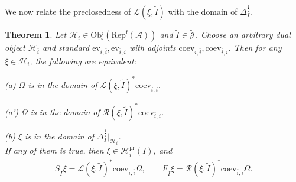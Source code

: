 \documentclass[12pt,a4paper]{article}
\theoremstyle{definition}
\theoremstyle{plain}
\newtheorem{thm}[df]{Theorem}
\newcommand{\mc}{\mathcal}
\newcommand{\wtd}{\widetilde}
\newcommand{\ovl}{\overline}
\newcommand{\ev}{\mathrm{ev}}
\newcommand{\coev}{\mathrm{coev}}
\newcommand{\scr}{\mathscr}
\newcommand{\Jtd}{\widetilde{\mathcal J}}
\newcommand{\RepfA}{\mathrm{Rep}^{\mathrm f}(\mc A)}
\newcommand{\Obj}{\mathrm{Obj}}
\newcommand{\pr}{\mathrm{pr}}
\numberwithin{equation}{section}
\begin{document}
We now relate the preclosedness of $\scr L(\xi,\wtd I)$ with the domain of $\Delta_I^{\frac 12}$. 

\begin{thm}
Let $\mc H_i\in\Obj(\RepfA)$ and $\wtd I\in\Jtd$. Choose an arbitrary dual object $\mc H_{\ovl i}$ and standard $\ev_{i,\ovl i},\ev_{\ovl i,i}$  with adjoints $\coev_{i,\ovl i},\coev_{\ovl i,i}$. Then for any $\xi\in\mc H_i$, the following are equivalent:

(a) $\Omega$ is in the domain of $\scr L(\xi,\wtd I)^*\coev_{i,\ovl i}$.

(a') $\Omega$ is in the domain of $\scr R(\xi,\wtd I)^*\coev_{\ovl i,i}$.

(b) $\xi$ is in the domain of $\Delta_I^{\frac 12}|_{\mc H_i}$.\\
If any of them is true, then $\xi\in\mc H_i^\pr(I)$, and 
\begin{align}
S_{\wtd I}\xi=\scr L(\xi,\wtd I)^*\coev_{i,\ovl i}\Omega,\qquad F_{\wtd I}\xi=\scr R(\xi,\wtd I)^*\coev_{\ovl i,i}\Omega.\label{eq53}
\end{align}
\end{thm}

 
\end{document}
